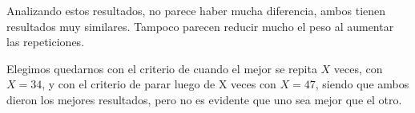 \vspace*{0.5cm}

Analizando estos resultados, no parece haber mucha diferencia, ambos tienen
resultados muy similares. Tampoco parecen reducir mucho el peso al
aumentar las repeticiones.

Elegimos quedarnos con el criterio de cuando el mejor se repita $X$ veces, con
$X = 34$, y con el criterio de parar luego de X veces con $X = 47$, siendo que
ambos dieron los mejores resultados, pero no es evidente que uno sea mejor que
el otro.
